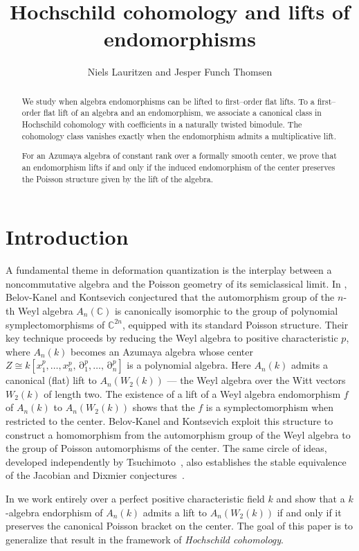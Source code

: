 \documentclass[a4paper,11pt,reqno]{amsart}%
\title{Hochschild cohomology and lifts of endomorphisms}
\author{Niels Lauritzen and Jesper Funch Thomsen}
\theoremstyle{definition}
\newcommand{\CC}{\mathbb{C}}
\renewcommand{\d}{\operatorname{{\partial}}}
\newcommand{\<}{\<}
\renewcommand{\>}{\>}
\numberwithin{equation}{subsection}
\begin{document}
\maketitle

\begin{abstract}

We study when algebra endomorphisms can be lifted to first--order flat lifts.  
To a first--order flat lift of an algebra and an endomorphism, we associate a 
canonical class in Hochschild cohomology with coefficients in a
naturally twisted bimodule. The cohomology class 
vanishes
exactly when the endomorphism admits a multiplicative lift.

For an Azumaya algebra of constant rank over a formally smooth center, we prove that 
an endomorphism lifts if and only if the 
induced endomorphism of the center preserves the Poisson structure given 
by the lift of the algebra.
\end{abstract}

\section{Introduction}

A fundamental theme in deformation quantization is the interplay between
a noncommutative algebra and the Poisson geometry of its semiclassical limit.
In \cite{BK}, Belov-Kanel and Kontsevich
conjectured that the automorphism group of the $n$-th Weyl algebra $A_n(\CC)$ 
is canonically isomorphic to the group of polynomial symplectomorphisms 
of $\CC^{2n}$, equipped with its standard Poisson structure.
Their key technique proceeds by 
reducing the Weyl algebra to positive characteristic $p$, 
where $A_n(k)$ becomes an Azumaya algebra whose center 
$Z \cong k[x_1^p, \ldots, x_n^p, \d_1^p, \ldots, \d_n^p]$ 
is a polynomial algebra. Here $A_n(k)$ admits 
a canonical (flat) lift to $A_n(W_2(k))$ --- the 
Weyl algebra over the Witt vectors $W_2(k)$  of length two. The existence of a lift of 
a Weyl algebra endomorphism $f$ of $A_n(k)$ to $A_n(W_2(k))$ shows that the
$f$ is a symplectomorphism when restricted to the center.
Belov-Kanel and Kontsevich exploit this structure to construct a homomorphism from the automorphism 
group of the Weyl algebra to the group of Poisson automorphisms of the center.
The same circle of ideas, developed independently by Tsuchimoto~\cite{Ts}, 
also establishes the stable equivalence of the Jacobian and Dixmier conjectures~\cite{BKJ}.

In \cite{LTL} we work entirely over a perfect positive characteristic field $k$ and show that 
a $k$ -algebra endorphism of $A_n(k)$ admits a lift to $A_n(W_2(k))$ 
if and only if it preserves the canonical Poisson bracket on the center.
 The goal of this paper is to generalize that result in the framework of 
 \emph{Hochschild cohomology}.
\end{document}
